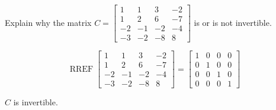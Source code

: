 
\begin{exerciseStatement}


Explain why the matrix \(C= \left[\begin{array}{cccc}
1 & 1 & 3 & -2 \\
1 & 2 & 6 & -7 \\
-2 & -1 & -2 & -4 \\
-3 & -2 & -8 & 8
\end{array}\right] \) is or is not invertible.


\end{exerciseStatement}
    
\begin{exerciseAnswer} 


\[\operatorname{RREF} \left[\begin{array}{cccc}
1 & 1 & 3 & -2 \\
1 & 2 & 6 & -7 \\
-2 & -1 & -2 & -4 \\
-3 & -2 & -8 & 8
\end{array}\right] = \left[\begin{array}{cccc}
1 & 0 & 0 & 0 \\
0 & 1 & 0 & 0 \\
0 & 0 & 1 & 0 \\
0 & 0 & 0 & 1
\end{array}\right] \]

\(C\) is invertible.
\end{exerciseAnswer}
    
